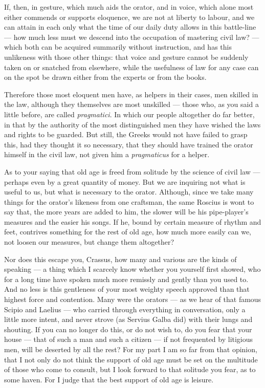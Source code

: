  If, then, in gesture, which much aids the orator, and in voice, which alone most either commends or supports eloquence, we are not at liberty to labour, and we can attain in each only what the time of our daily duty allows in this battle-line — how much less must we descend into the occupation of mastering civil law? — which both can be acquired summarily without instruction, and has this unlikeness with those other things: that voice and gesture cannot be suddenly taken on or snatched from elsewhere, while the usefulness of law for any case can on the spot be drawn either from the experts or from the books.

 Therefore those most eloquent men have, as helpers in their cases, men skilled in the law, although they themselves are most unskilled — those who, as you said a little before, are called \textit{pragmatici}. In which our people altogether do far better, in that by the authority of the most distinguished men they have wished the laws and rights to be guarded. But still, the Greeks would not have failed to grasp this, had they thought it so necessary, that they should have trained the orator himself in the civil law, not given him a \textit{pragmaticus} for a helper.

 As to your saying that old age is freed from solitude by the science of civil law — perhaps even by a great quantity of money. But we are inquiring not what is useful to us, but what is necessary to the orator. Although, since we take many things for the orator's likeness from one craftsman, the same Roscius is wont to say that, the more years are added to him, the slower will be his pipe-player's measures and the easier his songs. If he, bound by certain measure of rhythm and feet, contrives something for the rest of old age, how much more easily can we, not loosen our measures, but change them altogether?

 Nor does this escape you, Crassus, how many and various are the kinds of speaking — a thing which I scarcely know whether you yourself first showed, who for a long time have spoken much more remissly and gently than you used to. And no less is this gentleness of your most weighty speech approved than that highest force and contention. Many were the orators — as we hear of that famous Scipio and Laelius — who carried through everything in conversation, only a little more intent, and never strove (as Servius Galba did) with their lungs and shouting. If you can no longer do this, or do not wish to, do you fear that your house — that of such a man and such a citizen — if not frequented by litigious men, will be deserted by all the rest? For my part I am so far from that opinion, that I not only do not think the support of old age must be set on the multitude of those who come to consult, but I look forward to that solitude you fear, as to some haven. For I judge that the best support of old age is leisure.

